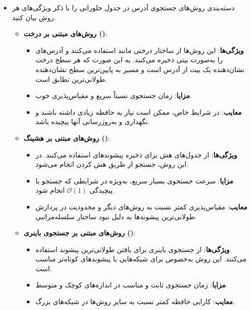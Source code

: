 \begin{itemize}
	
	\item  دسته‌بندی روش‌های جستجوی آدرس  در جدول جلورانی را با ذکر ویژگی‌های هر روش بیان کنید.
	\begin{qsolve}
		\begin{itemize}
			\item \textbf{روش‌های مبتنی بر درخت ()}:
			\begin{itemize}
				\item \textbf{ویژگی‌ها}: این روش‌ها از ساختار درختی مانند  استفاده می‌کنند و آدرس‌های  را به‌صورت بیتی ذخیره می‌کنند. به این صورت که هر سطح درخت نشان‌دهنده یک بیت از آدرس است و مسیر به پایین‌ترین سطح نشان‌دهنده طولانی‌ترین تطابق است.
				\item \textbf{مزایا}: زمان جستجوی نسبتاً سریع و مقیاس‌پذیری خوب.
				\item \textbf{معایب}: در شرایط خاص، ممکن است نیاز به حافظه زیادی داشته باشند و نگهداری و به‌روزرسانی آنها پیچیده باشد.
			\end{itemize}
			
			\item \textbf{روش‌های مبتنی بر هشینگ ()}:
			\begin{itemize}
				\item \textbf{ویژگی‌ها}: از جدول‌های هش برای ذخیره پیشوندهای  استفاده می‌کنند. در این روش، جستجو از طریق هش کردن انجام می‌شود.
				\item \textbf{مزایا}: سرعت جستجوی بسیار سریع، به‌ویژه در شرایطی که جستجو با پیچیدگی \(\mathcal{O}(1)\) انجام شود.
				\item \textbf{معایب}: مقیاس‌پذیری کمتر نسبت به روش‌های دیگر و محدودیت در پردازش طولانی‌ترین پیشوندها به دلیل نبود ساختار سلسله‌مراتبی.
			\end{itemize}
			
			\item \textbf{روش‌های مبتنی بر جستجوی باینری ()}:
			\begin{itemize}
				\item \textbf{ویژگی‌ها}: از جستجوی باینری برای یافتن طولانی‌ترین پیشوند استفاده می‌کنند. این روش به‌خصوص برای شبکه‌هایی با پیشوندهای کوتاه‌تر مناسب است.
				\item \textbf{مزایا}: زمان جستجوی ثابت و مناسب در اندازه‌های کوچک و متوسط.
				\item \textbf{معایب}: کارایی حافظه کمتر نسبت به سایر روش‌ها در شبکه‌های بزرگ.
			\end{itemize}
		\end{itemize}
	\end{qsolve}
	

\end{itemize}
